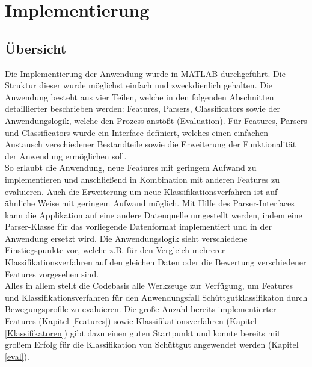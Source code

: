 \section{Implementierung}

\subsection{Übersicht}
Die Implementierung der Anwendung wurde in MATLAB durchgeführt. Die Struktur dieser wurde möglichst einfach und zweckdienlich gehalten. Die Anwendung besteht aus vier Teilen, welche in den folgenden Abschnitten detaillierter beschrieben werden: Features, Parsers, Classificators sowie der Anwendungslogik, welche den Prozess anstößt (Evaluation). Für Features, Parsers und Classificators wurde ein Interface definiert, welches einen einfachen Austausch verschiedener Bestandteile sowie die Erweiterung der Funktionalität der Anwendung ermöglichen soll. \\
So erlaubt die Anwendung, neue Features mit geringem Aufwand zu implementieren und anschließend in Kombination mit anderen Features zu evaluieren. Auch die Erweiterung um neue Klassifikationsverfahren ist auf ähnliche Weise mit geringem Aufwand möglich. Mit Hilfe des Parser-Interfaces kann die Applikation auf eine andere Datenquelle umgestellt werden, indem eine Parser-Klasse für das vorliegende Datenformat implementiert und in der Anwendung ersetzt wird. Die Anwendungslogik sieht verschiedene Einstiegspunkte vor, welche z.B. für den Vergleich mehrerer Klassifikationsverfahren auf den gleichen Daten oder die Bewertung verschiedener Features vorgesehen sind. \\
Alles in allem stellt die Codebasis alle Werkzeuge zur Verfügung, um Features und Klassifikationsverfahren für den Anwendungsfall Schüttgutklassifikaton durch Bewegungsprofile zu evaluieren. Die große Anzahl bereits implementierter Features (Kapitel \ref{Features}) sowie Klassifikationsverfahren (Kapitel \ref{Klassifikatoren}) gibt dazu einen guten Startpunkt und konnte bereits mit großem Erfolg für die Klassifikation von Schüttgut angewendet werden (Kapitel \ref{eval}).

